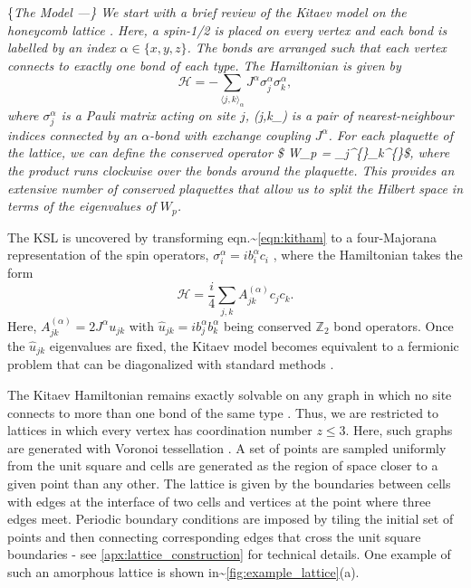 \{\it The Model ---\} We start with a brief review of the Kitaev model
on the honeycomb lattice \cite{kitaevAnyonsExactlySolved2006}. Here, a
spin-1/2 is placed on every vertex and each bond is labelled by an index
\(\alpha \in \{ x, y, z\}\). The bonds are arranged such that each
vertex connects to exactly one bond of each type. The Hamiltonian is
given by \begin{equation}
    \label{eqn:kitham}
    \mathcal{H} =  - \sum_{\langle j,k\rangle_\alpha} J^{\alpha}\sigma_j^{\alpha}\sigma_k^{\alpha},
\end{equation} where \(\sigma^\alpha_j\) is a Pauli matrix acting on
site \(j\), (\langle j,k\rangle\_\alpha) is a pair of nearest-neighbour
indices connected by an \(\alpha\)-bond with exchange coupling
\(J^\alpha\). For each plaquette of the lattice, we can define the
conserved operator \$ W\_p =
\prod \sigma\_j\^{}\{\alpha\}\sigma\_k\^{}\{\alpha\}\$, where the
product runs clockwise over the bonds around the plaquette. This
provides an extensive number of conserved plaquettes that allow us to
split the Hilbert space in terms of the eigenvalues of \(W_p\).

\par

The KSL is uncovered by transforming
eqn.\textasciitilde{}\ref{eqn:kitham} to a four-Majorana representation
of the spin operators, \(\sigma_i^\alpha = i b_i^\alpha c_i\)
\cite{kitaevAnyonsExactlySolved2006}, where the Hamiltonian takes the
form \begin{equation}\label{eqn:majorana_hamiltonian}
    \mathcal{H} = \frac{i}{4}\sum_{j,k}A_{jk}^{(\alpha)}c_jc_k.
\end{equation} Here, \(A_{jk}^{(\alpha)}=2J^{\alpha}u_{jk}\) with
\(\hat u_{jk} = ib_j^{\alpha}b_k^{\alpha}\) being conserved
\(\mathbb Z_2\) bond operators. Once the \(\hat u_{jk}\) eigenvalues are
fixed, the Kitaev model becomes equivalent to a fermionic problem that
can be diagonalized with standard methods \cite{BlaizotRipka1986}.

\par

The Kitaev Hamiltonian remains exactly solvable on any graph in which no
site connects to more than one bond of the same type
\cite{Nussinov2009}. Thus, we are restricted to lattices in which every
vertex has coordination number \(z \leq 3\). Here, such graphs are
generated with Voronoi tessellation \cite{florescu_designer_2009}. A set
of points are sampled uniformly from the unit square and cells are
generated as the region of space closer to a given point than any other.
The lattice is given by the boundaries between cells with edges at the
interface of two cells and vertices at the point where three edges meet.
Periodic boundary conditions are imposed by tiling the initial set of
points and then connecting corresponding edges that cross the unit
square boundaries - see \cref{apx:lattice_construction} for technical
details. One example of such an amorphous lattice is shown
in\textasciitilde{}\cref{fig:example_lattice}(a).

